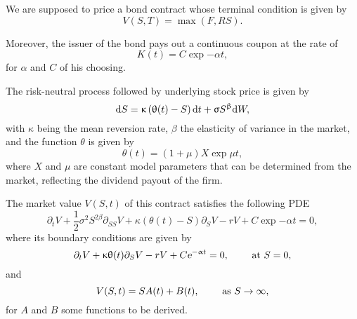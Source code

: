 \noindent We are supposed to price a bond contract whose terminal condition is given by
\begin{equation}
	V(S,T) = \max \left(F, RS\right).
\end{equation}

Moreover, the issuer of the bond pays out a continuous coupon at the rate of 
\begin{equation}
	K(t) = C \exp{-\alpha t},
\end{equation}
for $\alpha$ and $C$ of his choosing. 

The risk-neutral process followed by underlying stock price is given by
\begin{equation}
	\text{\rm d} S = \upkappa \left(\uptheta(t)  - S\right)\text{\rm d} t + \upsigma S^\upbeta \text{\rm d} W,
\end{equation}
with $\kappa$ being the mean reversion rate, $\beta$ the elasticity of variance in the market, and the function $\theta$ is given by
\begin{equation}
	\theta(t) = (1+\mu)X\exp{\mu t},
\end{equation}
where $X$ and $\mu$ are constant model parameters that can be determined from the market, reflecting the dividend payout of the firm.

The market value $V(S,t)$ of this contract satisfies the following PDE
\begin{equation}\label{general_pde}
	\partial_t V + \frac{1}{2}\sigma^2 S^{2\beta}\partial_{SS}V + \kappa (\theta(t) - S)\partial_SV - rV + C\exp{-\alpha t} = 0,
\end{equation}
where its boundary conditions are given by
\begin{equation}\label{pde_S0}
	\partial_t V + \upkappa \uptheta(t) \partial_S V - rV + C\text{\sl e}^{-\upalpha t} = 0, \quad\quad \text{ at } S= 0,
\end{equation}
and
\begin{equation}
	V(S,t) = S A(t) + B(t), \quad\quad \text{ as } S\to\infty,
\end{equation}
for $A$ and $B$ some functions to be derived.